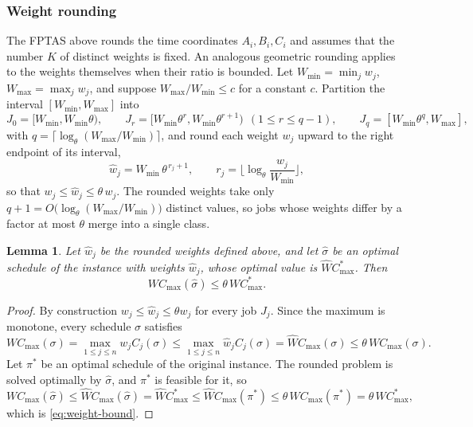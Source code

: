 \documentclass[12pt]{article}
\newtheorem{lemma}{Lemma}[section]
\begin{document}
\begin{sloppypar}
\subsubsection{Weight rounding}
\label{subsub:fptas-weight}

The FPTAS above rounds the time coordinates $A_i,B_i,C_i$ and assumes that the number $K$ of
distinct weights is fixed. An analogous geometric rounding applies to the weights themselves when
their ratio is bounded. Let $W_{\min}=\min_{j}w_j$, $W_{\max}=\max_{j}w_j$, and suppose
$W_{\max}/W_{\min}\le c$ for a constant $c$. Partition the interval $[W_{\min},W_{\max}]$ into
\[
J_0=[W_{\min},W_{\min}\theta),\qquad
J_r=[W_{\min}\theta^{r},W_{\min}\theta^{r+1})\ \ (1\le r\le q-1),\qquad
J_q=[W_{\min}\theta^{q},W_{\max}],
\]
with $q=\big\lceil\log_\theta(W_{\max}/W_{\min})\big\rceil$, and round each weight $w_j$ upward to
the right endpoint of its interval,
\[
\hat w_j=W_{\min}\,\theta^{\,r_j+1},\qquad
r_j=\Big\lfloor\log_\theta\frac{w_j}{W_{\min}}\Big\rfloor,
\]
so that $w_j\le\hat w_j\le\theta\,w_j$. The rounded weights take only
$q+1=O\big(\log_\theta(W_{\max}/W_{\min})\big)$ distinct values, so jobs whose weights differ by a
factor at most $\theta$ merge into a single class.

\begin{lemma}\label{lem:weight-approx}
Let $\hat w_j$ be the rounded weights defined above, and let $\hat\sigma$ be an optimal schedule of
the instance with weights $\hat w_j$, whose optimal value is $\hat W C_{\max}^{*}$. Then
\begin{equation}\label{eq:weight-bound}
W C_{\max}(\hat\sigma)\le\theta\,W C_{\max}^{*}.
\end{equation}
\end{lemma}

\begin{proof}
By construction $w_j\le\hat w_j\le\theta w_j$ for every job $J_j$. Since the maximum is monotone,
every schedule $\sigma$ satisfies
\[
W C_{\max}(\sigma)=\max_{1\le j\le n}w_j C_j(\sigma)
\le\max_{1\le j\le n}\hat w_j C_j(\sigma)=\hat W C_{\max}(\sigma)
\le\theta\,W C_{\max}(\sigma).
\]
Let $\pi^{*}$ be an optimal schedule of the original instance. The rounded problem is solved
optimally by $\hat\sigma$, and $\pi^{*}$ is feasible for it, so
\[
W C_{\max}(\hat\sigma)\le\hat W C_{\max}(\hat\sigma)=\hat W C_{\max}^{*}
\le\hat W C_{\max}(\pi^{*})\le\theta\,W C_{\max}(\pi^{*})=\theta\,W C_{\max}^{*},
\]
which is \cref{eq:weight-bound}.
\end{proof}


\end{sloppypar}
\end{document}
